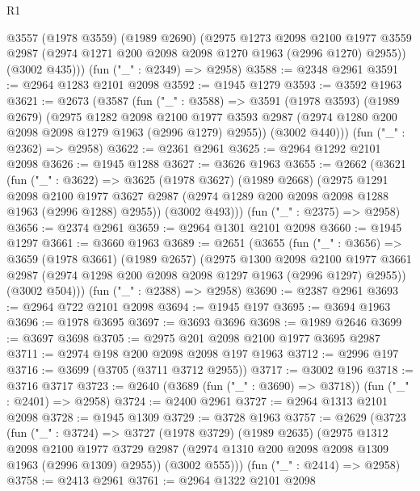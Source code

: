 \begin{lexlean}{R1}
\begin{coremodule}
      @3557
        (@1978 @3559)
        (@1989 @2690)
        (@2975
          @1273
          @2098
          @2100
          @1977
          @3559
          @2987
          (@2974 @1271 @200 @2098 @2098 @1270 @1963 (@2996 @1270) @2955))
        (@3002 @435)))
    (fun ("_" : @2349) => @2958)
@3588 := @2348 @2961
@3591 := @2964 @1283 @2101 @2098
@3592 := @1945 @1279
@3593 := @3592 @1963
@3621 := @2673
    (@3587
      (fun ("_" : @3588) =>
      @3591
        (@1978 @3593)
        (@1989 @2679)
        (@2975
          @1282
          @2098
          @2100
          @1977
          @3593
          @2987
          (@2974 @1280 @200 @2098 @2098 @1279 @1963 (@2996 @1279) @2955))
        (@3002 @440)))
    (fun ("_" : @2362) => @2958)
@3622 := @2361 @2961
@3625 := @2964 @1292 @2101 @2098
@3626 := @1945 @1288
@3627 := @3626 @1963
@3655 := @2662
    (@3621
      (fun ("_" : @3622) =>
      @3625
        (@1978 @3627)
        (@1989 @2668)
        (@2975
          @1291
          @2098
          @2100
          @1977
          @3627
          @2987
          (@2974 @1289 @200 @2098 @2098 @1288 @1963 (@2996 @1288) @2955))
        (@3002 @493)))
    (fun ("_" : @2375) => @2958)
@3656 := @2374 @2961
@3659 := @2964 @1301 @2101 @2098
@3660 := @1945 @1297
@3661 := @3660 @1963
@3689 := @2651
    (@3655
      (fun ("_" : @3656) =>
      @3659
        (@1978 @3661)
        (@1989 @2657)
        (@2975
          @1300
          @2098
          @2100
          @1977
          @3661
          @2987
          (@2974 @1298 @200 @2098 @2098 @1297 @1963 (@2996 @1297) @2955))
        (@3002 @504)))
    (fun ("_" : @2388) => @2958)
@3690 := @2387 @2961
@3693 := @2964 @722 @2101 @2098
@3694 := @1945 @197
@3695 := @3694 @1963
@3696 := @1978 @3695
@3697 := @3693 @3696
@3698 := @1989 @2646
@3699 := @3697 @3698
@3705 := @2975 @201 @2098 @2100 @1977 @3695 @2987
@3711 := @2974 @198 @200 @2098 @2098 @197 @1963
@3712 := @2996 @197
@3716 := @3699 (@3705 (@3711 @3712 @2955))
@3717 := @3002 @196
@3718 := @3716 @3717
@3723 := @2640 (@3689 (fun ("_" : @3690) => @3718)) (fun ("_" : @2401) => @2958)
@3724 := @2400 @2961
@3727 := @2964 @1313 @2101 @2098
@3728 := @1945 @1309
@3729 := @3728 @1963
@3757 := @2629
    (@3723
      (fun ("_" : @3724) =>
      @3727
        (@1978 @3729)
        (@1989 @2635)
        (@2975
          @1312
          @2098
          @2100
          @1977
          @3729
          @2987
          (@2974 @1310 @200 @2098 @2098 @1309 @1963 (@2996 @1309) @2955))
        (@3002 @555)))
    (fun ("_" : @2414) => @2958)
@3758 := @2413 @2961
@3761 := @2964 @1322 @2101 @2098

\end{coremodule}
\end{lexlean}
